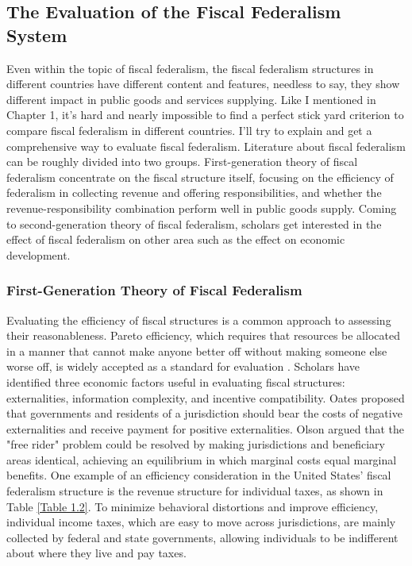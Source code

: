 \subsection{The Evaluation of the Fiscal Federalism System}
Even within the topic of fiscal federalism, the fiscal federalism structures in different countries have different content and features, needless to say, they show different impact in public goods and services supplying. Like I mentioned in Chapter 1, it's hard and nearly impossible to find a perfect stick yard criterion to compare fiscal federalism in different countries. I'll try to explain and get a comprehensive way to evaluate fiscal federalism. Literature about fiscal federalism can be roughly divided into two groups. First-generation theory of fiscal federalism concentrate on the fiscal structure itself, focusing on the efficiency of federalism in collecting revenue and offering responsibilities, and whether the revenue-responsibility combination perform well in public goods supply. Coming to second-generation theory of fiscal federalism, scholars get interested in the effect of fiscal federalism on other area such as the effect on economic development.

\subsubsection{First-Generation Theory of Fiscal Federalism}

Evaluating the efficiency of fiscal structures is a common approach to assessing their reasonableness. Pareto efficiency, which requires that resources be allocated in a manner that cannot make anyone better off without making someone else worse off, is widely accepted as a standard for evaluation \cite{pareto2014manual}. Scholars have identified three economic factors useful in evaluating fiscal structures: externalities, information complexity, and incentive compatibility. Oates \cite{oates1972fiscal} proposed that governments and residents of a jurisdiction should bear the costs of negative externalities and receive payment for positive externalities. Olson \cite{olson1993dictatorship} argued that the "free rider" problem could be resolved by making jurisdictions and beneficiary areas identical, achieving an equilibrium in which marginal costs equal marginal benefits. One example of an efficiency consideration in the United States' fiscal federalism structure is the revenue structure for individual taxes, as shown in Table \ref*{Table 1.2}. To minimize behavioral distortions and improve efficiency, individual income taxes, which are easy to move across jurisdictions, are mainly collected by federal and state governments, allowing individuals to be indifferent about where they live and pay taxes.

